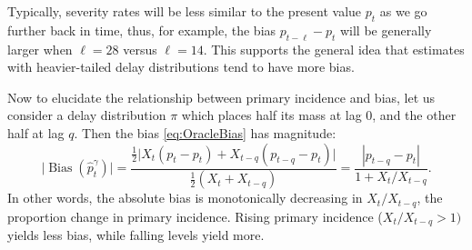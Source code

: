 \documentclass{article}
\renewcommand{\hat}{\widehat} %
\DeclareMathOperator{\bias}{Bias}
\begin{document}
Typically, severity rates will be less similar to the present value $p_t$ as we
go further back in time, thus, for  example, the bias $p_{t-\ell}-p_t$ will be
generally larger when $\ell=28$ versus $\ell=14$. This supports the general idea
that estimates with heavier-tailed delay distributions tend to have more bias.          

Now to elucidate the relationship between primary incidence and bias, let us 
consider a delay distribution $\pi$ which places half its mass at lag 0, and the
other half at lag $q$. Then the bias \eqref{eq:OracleBias} has magnitude:
\[
\big| \bias(\hat{p}_t^{\gamma}) \big| = \frac{\frac{1}{2} \big| X_t(p_t-p_t) +
  X_{t-q}(p_{t-q}-p_t) \big|} {\frac{1}{2}(X_t+X_{t-q})} = \frac{|p_{t-q}-p_t|}
{1 + X_t / X_{t-q}}. 
\]
In other words, the absolute bias is monotonically decreasing in
$X_t / X_{t-q}$, the proportion change in primary incidence. Rising  
primary incidence ($X_t / X_{t-q} > 1)$ yields less bias, while falling 
levels yield more. 


\end{document}
